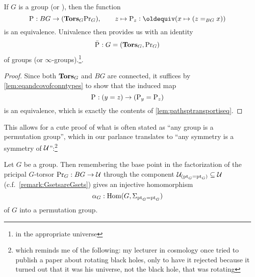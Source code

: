 \begin{theorem}\label{lem:BGbytorsor}
  If $G$ is a group (or \inftygp), then the function
$$\pathsp{}:BG\to(\typetorsor_G\princ G),\qquad z\mapsto \pathsp z\defequi(x\mapsto(z=_{BG}x))$$
is an equivalence.
Univalence then provides us with an identity 
$$\bar{\mathrm{P}_{}}:G=(\mathbf{Tors}_G,\mathrm{Pr}_{{G}})$$ of groups (or $\infty$-groups).\footnote{in the appropriate universe}.
\end{theorem}

\begin{proof}
  Since both $\mathbf{Tors}_G$ and $BG$ are connected, it suffices by \cref{lem:eqandcovofconntypes} to show that the induced map
$$\mathrm{P}_{}:(y=z)\to(\mathrm{P}_{y}= \mathrm{P}_{z})
$$
is an equivalence, which is exactly the contents of \cref{lem:pathsptransportiseq}.  


\end{proof}
This allows for a cute proof of what is often stated as ``any group is a permutation group'', which in our parlance translates to ``any symmetry is a symmetry of $\mathcal{U}$'':\footnote{which reminds me of the following: my lecturer in cosmology once tried to publish a paper about rotating black holes, only to have it rejected because it turned out that it was his universe, not the black hole, that was rotating}
\begin{lemma}
  \label{lem:allgpsarepermutationgps}Let $G$ be a group.  Then remembering the base point in the factorization of the pricipal $G$-torsor $\mathrm{Pr}_{{G}}:BG\to\mathcal{U}$ through the component $\mathcal{U}_{({\mathord{\mathrm{pt}}}_G={\mathord{\mathrm{pt}}}_G)}\subseteq\mathcal{U}$ (c.f.~\cref{remark:GsetsareGsets}) gives an injective homomorphism
$$\alpha_G:\mathrm{Hom}(G,\Sigma_{{\mathord{\mathrm{pt}}}_G={\mathord{\mathrm{pt}}}_G})$$  
of $G$ into a permutation group.
\end{lemma}
